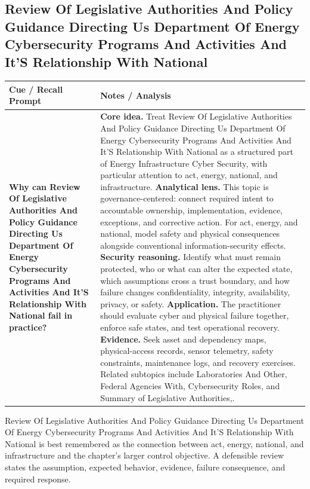 \documentclass[11pt]{article}
\newcommand{\CornellHeader}{%
\rowcolor{Navy}\color{white}\bfseries Cue / Recall Prompt & \color{white}\bfseries Notes / Analysis\\\hline}
\newcommand{\CornellRow}[2]{%
\cellcolor{CueGray}\RaggedRight\textbf{#1} & \RaggedRight #2\\\hline}
\begin{document}
\subsection*{Review Of Legislative Authorities And Policy Guidance Directing Us Department Of Energy Cybersecurity Programs And Activities And It'S Relationship With National}
\begin{longtable}{>{\RaggedRight\arraybackslash}p{}|>{\RaggedRight\arraybackslash}p{}}
\CornellHeader
\CornellRow{Why can Review Of Legislative Authorities And Policy Guidance Directing Us Department Of Energy Cybersecurity Programs And Activities And It'S Relationship With National fail in practice?}{\textbf{Core idea.} Treat Review Of Legislative Authorities And Policy Guidance Directing Us Department Of Energy Cybersecurity Programs And Activities And It'S Relationship With National as a structured part of Energy Infrastructure Cyber Security, with particular attention to act, energy, national, and infrastructure. \textbf{Analytical lens.} This topic is governance-centered: connect required intent to accountable ownership, implementation, evidence, exceptions, and corrective action. For act, energy, and national, model safety and physical consequences alongside conventional information-security effects. \textbf{Security reasoning.} Identify what must remain protected, who or what can alter the expected state, which assumptions cross a trust boundary, and how failure changes confidentiality, integrity, availability, privacy, or safety. \textbf{Application.} The practitioner should evaluate cyber and physical failure together, enforce safe states, and test operational recovery. \textbf{Evidence.} Seek asset and dependency maps, physical-access records, sensor telemetry, safety constraints, maintenance logs, and recovery exercises. Related subtopics include Laboratories And Other, Federal Agencies With, Cybersecurity Roles, and Summary of Legislative Authorities,.}
\end{longtable}
\begin{topicsummary}
Review Of Legislative Authorities And Policy Guidance Directing Us Department Of Energy Cybersecurity Programs And Activities And It'S Relationship With National is best remembered as the connection between act, energy, national, and infrastructure and the chapter's larger control objective. A defensible review states the assumption, expected behavior, evidence, failure consequence, and required response.
\end{topicsummary}
\end{document}
